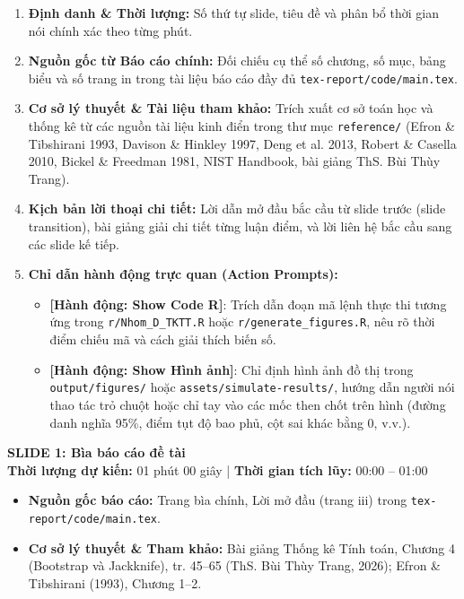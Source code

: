 \documentclass[10pt,a4paper]{article}
\newcommand{\slideheader}[4]{
    \vspace{0.4cm}
    \begin{tcolorbox}[colback=primary!7!white, colframe=primary, arc=2mm, boxrule=1pt, left=4mm, right=4mm, top=2.5mm, bottom=2.5mm]
        {\Large\bfseries\color{primary} SLIDE #1: #2}\\[0.1cm]
        {\small\textbf{Thời lượng dự kiến:} #3 \quad | \quad \textbf{Thời gian tích lũy:} #4}
    \end{tcolorbox}
    \vspace{0.15cm}
}
\begin{document}
\begin{enumerate}
    \item \textbf{Định danh \& Thời lượng:} Số thứ tự slide, tiêu đề và phân bổ thời gian nói chính xác theo từng phút.
    \item \textbf{Nguồn gốc từ Báo cáo chính:} Đối chiếu cụ thể số chương, số mục, bảng biểu và số trang in trong tài liệu báo cáo đầy đủ \texttt{tex-report/code/main.tex}.
    \item \textbf{Cơ sở lý thuyết \& Tài liệu tham khảo:} Trích xuất cơ sở toán học và thống kê từ các nguồn tài liệu kinh điển trong thư mục \texttt{reference/} (Efron \& Tibshirani 1993, Davison \& Hinkley 1997, Deng et al. 2013, Robert \& Casella 2010, Bickel \& Freedman 1981, NIST Handbook, bài giảng ThS. Bùi Thùy Trang).
    \item \textbf{Kịch bản lời thoại chi tiết:} Lời dẫn mở đầu bắc cầu từ slide trước (slide transition), bài giảng giải chi tiết từng luận điểm, và lời liên hệ bắc cầu sang các slide kế tiếp.
    \item \textbf{Chỉ dẫn hành động trực quan (Action Prompts):}
    \begin{itemize}
        \item \color{accentgreen}\textbf{[Hành động: Show Code R]}\color{black}: Trích dẫn đoạn mã lệnh thực thi tương ứng trong \texttt{r/Nhom\_D\_TKTT.R} hoặc \texttt{r/generate\_figures.R}, nêu rõ thời điểm chiếu mã và cách giải thích biến số.
        \item \color{accentorange}\textbf{[Hành động: Show Hình ảnh]}\color{black}: Chỉ định hình ảnh đồ thị trong \texttt{output/figures/} hoặc \texttt{assets/simulate-results/}, hướng dẫn người nói thao tác trỏ chuột hoặc chỉ tay vào các mốc then chốt trên hình (đường danh nghĩa 95\%, điểm tụt độ bao phủ, cột sai khác bằng 0, v.v.).
    \end{itemize}
\end{enumerate}

\newpage

\slideheader{1}{Bìa báo cáo đề tài}{01 phút 00 giây}{00:00 -- 01:00}

\begin{itemize}
    \item \textbf{Nguồn gốc báo cáo:} Trang bìa chính, Lời mở đầu (trang iii) trong \texttt{tex-report/code/main.tex}.
    \item \textbf{Cơ sở lý thuyết \& Tham khảo:} Bài giảng Thống kê Tính toán, Chương 4 (Bootstrap và Jackknife), tr. 45--65 (ThS. Bùi Thùy Trang, 2026); Efron \& Tibshirani (1993), Chương 1--2.
\end{itemize}
\end{document}
